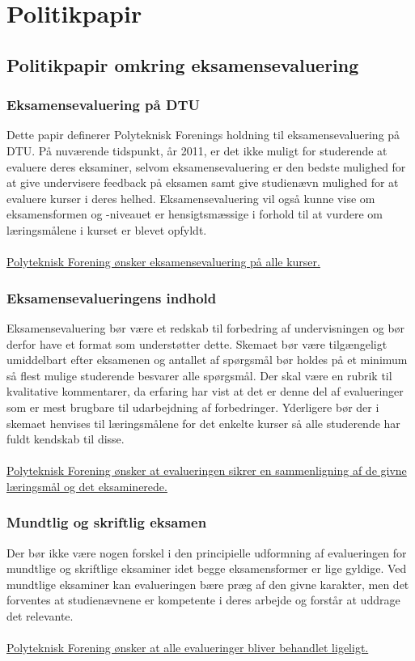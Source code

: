 \section{Politikpapir}

\subsection{Politikpapir omkring eksamensevaluering}
\subsubsection{Eksamensevaluering på DTU}
Dette papir definerer Polyteknisk Forenings holdning til eksamensevaluering på DTU.
På nuværende tidspunkt, år 2011, er det ikke muligt for studerende at evaluere deres eksaminer, selvom eksamensevaluering er den bedste mulighed for at give undervisere feedback på eksamen samt give studienævn mulighed for at evaluere kurser i deres helhed. Eksamensevaluering vil også kunne vise om eksamensformen og -niveauet er hensigtsmæssige i forhold til at vurdere om læringsmålene i kurset er blevet opfyldt.\\
\\
\underline{Polyteknisk Forening ønsker eksamensevaluering på alle kurser.}

\subsubsection{Eksamensevalueringens indhold}
Eksamensevaluering bør være et redskab til forbedring af undervisningen og bør derfor have et format som understøtter dette. Skemaet bør være tilgængeligt umiddelbart efter eksamenen og antallet af spørgsmål bør holdes på et minimum så flest mulige studerende besvarer alle spørgsmål. Der skal være en rubrik til kvalitative kommentarer, da erfaring har vist at det er denne del af evalueringer som er mest brugbare til udarbejdning af forbedringer. Yderligere bør der i skemaet henvises til læringsmålene for det enkelte kurser så alle studerende har fuldt kendskab til disse.\\
\\
\underline{Polyteknisk Forening ønsker at evalueringen sikrer en sammenligning af de givne læringsmål og det eksaminerede.}

\subsubsection{Mundtlig og skriftlig eksamen}
Der bør ikke være nogen forskel i den principielle udformning af evalueringen for mundtlige og skriftlige eksaminer idet begge eksamensformer er lige gyldige. Ved mundtlige eksaminer kan evalueringen bære præg af den givne karakter, men det forventes at studienævnene er kompetente i deres arbejde og forstår at uddrage det relevante.\\
\\
\underline{Polyteknisk Forening ønsker at alle evalueringer bliver behandlet ligeligt.}


